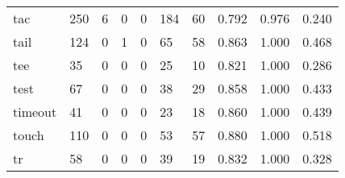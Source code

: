 \begin{longtable}{lp{1.3cm}p{1.3cm}p{1.3cm}p{1.3cm}p{1.3cm}p{1.3cm}p{1.3cm}p{1.3cm}p{1.3cm}}
tac       &                    250 &                                             6 &                                            0 &                                           0 &                                          184 &                                         60 &                                0.792 &                                  0.976 &                                0.240 \\
tail      &                    124 &                                             0 &                                            1 &                                           0 &                                           65 &                                         58 &                                0.863 &                                  1.000 &                                0.468 \\
tee       &                     35 &                                             0 &                                            0 &                                           0 &                                           25 &                                         10 &                                0.821 &                                  1.000 &                                0.286 \\
test      &                     67 &                                             0 &                                            0 &                                           0 &                                           38 &                                         29 &                                0.858 &                                  1.000 &                                0.433 \\
timeout   &                     41 &                                             0 &                                            0 &                                           0 &                                           23 &                                         18 &                                0.860 &                                  1.000 &                                0.439 \\
touch     &                    110 &                                             0 &                                            0 &                                           0 &                                           53 &                                         57 &                                0.880 &                                  1.000 &                                0.518 \\
tr        &                     58 &                                             0 &                                            0 &                                           0 &                                           39 &                                         19 &                                0.832 &                                  1.000 &                                0.328 \\

\end{longtable}
